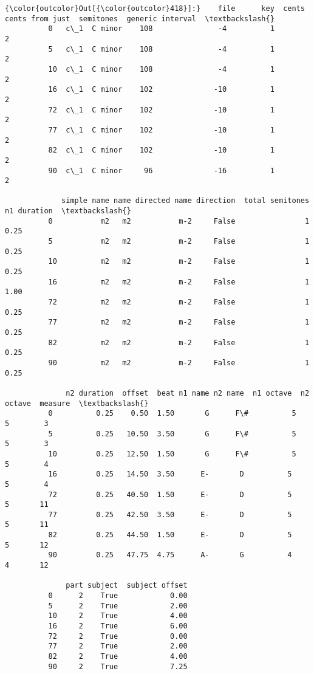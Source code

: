 \begin{Verbatim}[commandchars=\\\{\}]
{\color{outcolor}Out[{\color{outcolor}418}]:}    file      key  cents  cents from just  semitones  generic interval  \textbackslash{}
          0   c\_1  C minor    108               -4          1                 2   
          5   c\_1  C minor    108               -4          1                 2   
          10  c\_1  C minor    108               -4          1                 2   
          16  c\_1  C minor    102              -10          1                 2   
          72  c\_1  C minor    102              -10          1                 2   
          77  c\_1  C minor    102              -10          1                 2   
          82  c\_1  C minor    102              -10          1                 2   
          90  c\_1  C minor     96              -16          1                 2   
          
             simple name name directed name direction  total semitones  n1 duration  \textbackslash{}
          0           m2   m2           m-2     False                1         0.25   
          5           m2   m2           m-2     False                1         0.25   
          10          m2   m2           m-2     False                1         0.25   
          16          m2   m2           m-2     False                1         1.00   
          72          m2   m2           m-2     False                1         0.25   
          77          m2   m2           m-2     False                1         0.25   
          82          m2   m2           m-2     False                1         0.25   
          90          m2   m2           m-2     False                1         0.25   
          
              n2 duration  offset  beat n1 name n2 name  n1 octave  n2 octave  measure  \textbackslash{}
          0          0.25    0.50  1.50       G      F\#          5          5        3   
          5          0.25   10.50  3.50       G      F\#          5          5        3   
          10         0.25   12.50  1.50       G      F\#          5          5        4   
          16         0.25   14.50  3.50      E-       D          5          5        4   
          72         0.25   40.50  1.50      E-       D          5          5       11   
          77         0.25   42.50  3.50      E-       D          5          5       11   
          82         0.25   44.50  1.50      E-       D          5          5       12   
          90         0.25   47.75  4.75      A-       G          4          4       12   
          
              part subject  subject offset  
          0      2    True            0.00  
          5      2    True            2.00  
          10     2    True            4.00  
          16     2    True            6.00  
          72     2    True            0.00  
          77     2    True            2.00  
          82     2    True            4.00  
          90     2    True            7.25  
\end{Verbatim}
